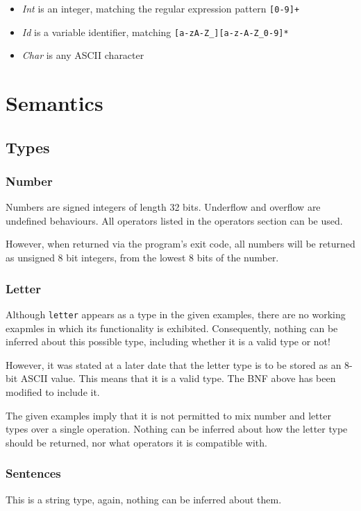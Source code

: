 \documentclass[a4paper,11pt]{article}
\begin{document}
\begin{itemize}
\item \emph{Int} is an integer, matching the regular expression pattern \verb:[0-9]+:
\item \emph{Id} is a variable identifier, matching \verb:[a-zA-Z_][a-z-A-Z_0-9]*:
\item \emph{Char} is any ASCII character
\end{itemize}

\section{Semantics}
\subsection{Types}
\subsubsection{Number}
Numbers are signed integers of length 32 bits. Underflow and overflow are
undefined behaviours. All operators listed in the operators section can be
used.

However, when returned via the program's exit code, all numbers will be
returned as unsigned 8 bit integers, from the lowest 8 bits of the number.

\subsubsection{Letter}
Although \verb:letter: appears as a type in the given examples, there are no
working exapmles in which its functionality is exhibited. Consequently, nothing
can be inferred about this possible type, including whether it is a valid type
or not!

However, it was stated at a later date that the letter type is to be stored as
an 8-bit ASCII value. This means that it is a valid type. The BNF above has been
modified to include it.

The given examples imply that it is not permitted to mix number and letter types
over a single operation. Nothing can be inferred about how the letter type should
be returned, nor what operators it is compatible with.

\subsubsection{Sentences}
This is a string type, again, nothing can be inferred about them.
\end{document}
